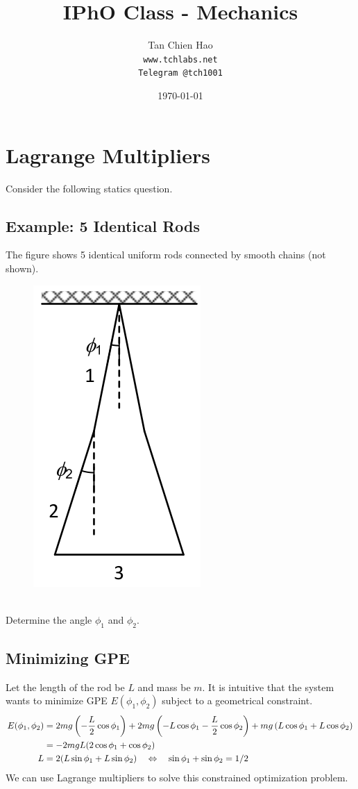 \documentclass{article}
\title{IPhO Class - Mechanics}
\author{
    Tan Chien Hao\\
    \texttt{www.tchlabs.net}\\
    \texttt{Telegram @tch1001}
}
\date{\today}
\begin{document}
\newif\ifpaper

\paperfalse 

\maketitle
\tableofcontents
\section{Lagrange Multipliers}
Consider the following statics question.
\subsection{Example: 5 Identical Rods}
The figure shows 5 identical uniform rods connected by smooth chains (not shown).
\begin{figure}[h]
    \centering
\includegraphics[width=0.4\linewidth]{images/5identicalrods.png}
\end{figure}\\
Determine the angle $\phi_1$ and $\phi_2$.
\subsection{Minimizing GPE}
Let the length of the rod be $L$ and mass be $m$. It is intuitive that the system wants to minimize GPE $E(\phi_1, \phi_2)$ subject to a geometrical constraint. 
\begin{align}
    E(\phi_1, \phi_2) &= 2 mg \left(-\frac{L}{2} \cos \phi_1 \right) + 2mg \left(-L \cos \phi_1 -\frac{L}{2} \cos \phi_2 \right) + mg \left(L \cos \phi_1 + L \cos \phi_2 \right) \notag \\
    &= -2 mgL (2 \cos \phi_1 + \cos \phi_2)  \\
    L &= 2 (L \sin \phi_1 + L \sin \phi_2) \quad \Leftrightarrow\quad \sin \phi_1 + \sin \phi_2 = 1/2
\end{align}
We can use Lagrange multipliers to solve this constrained optimization problem.
\end{document}
